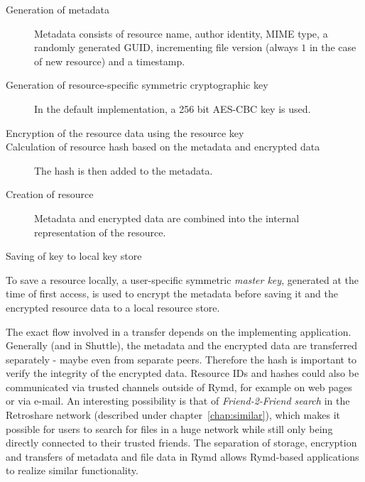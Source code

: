 \begin{description}
  \item[Generation of metadata] Metadata consists of resource name, author identity, MIME type, a randomly generated GUID, incrementing file version (always $1$ in the case of new resource) and a timestamp.
  \item[Generation of resource-specific symmetric cryptographic key] In the default implementation, a 256 bit AES-CBC key is used.
  \item[Encryption of the resource data using the resource key]
  \item[Calculation of resource hash based on the metadata and encrypted data] The hash is then added to the metadata.
  \item[Creation of resource] Metadata and encrypted data are combined into the internal representation of the resource.
  \item[Saving of key to local key store]
\end{description}

To save a resource locally, a user-specific symmetric \emph{master key}, generated at the time of first access, is used to encrypt the metadata before saving it and the encrypted resource data to a local resource store.

The exact flow involved in a transfer depends on the implementing application. Generally (and in Shuttle), the metadata and the encrypted data are transferred separately - maybe even from separate peers. Therefore the hash is important to verify the integrity of the encrypted data. Resource IDs and hashes could also be communicated via trusted channels outside of Rymd, for example on web pages or via e-mail. An interesting possibility is that of \emph{Friend-2-Friend search} in the Retroshare network (described under chapter~\ref{chap:similar}), which makes it possible for users to search for files in a huge network while still only being directly connected to their trusted friends. The separation of storage, encryption and transfers of metadata and file data in Rymd allows Rymd-based applications to realize similar functionality.

